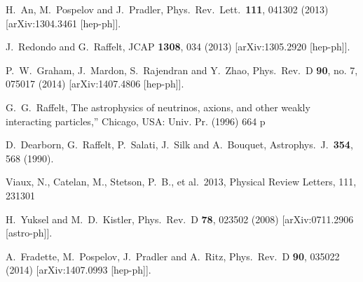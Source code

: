 \documentclass[prd,reprint,nofootinbib,notitlepage,aps,tightenlines,preprintnumbers,amsmath,amssymb,showpacs,superscriptaddress]{revtex4-1}
\begin{document}
\begin{thebibliography}{99}
  H.~An, M.~Pospelov and J.~Pradler,
  Phys.\ Rev.\ Lett.\  {\bf 111}, 041302 (2013)
  [arXiv:1304.3461 [hep-ph]].

  J.~Redondo and G.~Raffelt,
  JCAP {\bf 1308}, 034 (2013)
  [arXiv:1305.2920 [hep-ph]].

  P.~W.~Graham, J.~Mardon, S.~Rajendran and Y.~Zhao,
  Phys.\ Rev.\ D {\bf 90}, no. 7, 075017 (2014)
  [arXiv:1407.4806 [hep-ph]].


  G.~G.~Raffelt,
The astrophysics of neutrinos, axions, and other weakly interacting particles,''
  Chicago, USA: Univ. Pr. (1996) 664 p


  D.~Dearborn, G.~Raffelt, P.~Salati, J.~Silk and A.~Bouquet,
  Astrophys.\ J.\  {\bf 354}, 568 (1990).

 Viaux, N., Catelan, M., 
Stetson, P.~B., et al.\ 2013, Physical Review Letters, 111, 231301 






  H.~Yuksel and M.~D.~Kistler,
  Phys.\ Rev.\ D {\bf 78}, 023502 (2008)
  [arXiv:0711.2906 [astro-ph]].



  A.~Fradette, M.~Pospelov, J.~Pradler and A.~Ritz,
  Phys.\ Rev.\ D {\bf 90}, 035022 (2014)
  [arXiv:1407.0993 [hep-ph]].


\end{thebibliography}
\end{document}
